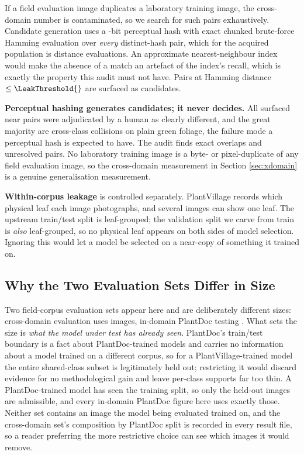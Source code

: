\documentclass[runningheads]{llncs}
\begin{document}
If a field evaluation image duplicates a laboratory training image, the
cross-domain number is contaminated, so we search for such pairs exhaustively.
Candidate generation uses a \PhashBits{}-bit perceptual hash with exact chunked
brute-force Hamming evaluation over \emph{every} distinct-hash pair, which for
the acquired population is \NPhashComparisonsSci{} distance evaluations. An
approximate nearest-neighbour index would make the absence of a match an artefact
of the index's recall, which is exactly the property this audit must not have.
Pairs at Hamming distance $\leq \LeakThreshold{}$ are surfaced as candidates.

\textbf{Perceptual hashing generates candidates; it never decides.} All
\NLeakNearCore{} surfaced near pairs were adjudicated by a human as clearly
different, and the great majority are cross-class collisions on plain green
foliage, the failure mode a perceptual hash is expected to have. The audit
finds \NLeakExactCore{} exact overlaps and \NLeakUnresolved{} unresolved pairs.
No laboratory training image is a byte- or pixel-duplicate of any field
evaluation image, so the cross-domain measurement in Section \ref{sec:xdomain}
is a genuine generalisation measurement.

\textbf{Within-corpus leakage} is controlled separately. PlantVillage records
which physical leaf each image photographs, and several images can show one
leaf. The upstream train/test split is leaf-grouped; the validation split we
carve from train is \emph{also} leaf-grouped, so no physical leaf appears on
both sides of model selection. Ignoring this would let a model be selected on a
near-copy of something it trained on.

\subsection{Why the Two Evaluation Sets Differ in Size}
\label{sec:two-eval-sets}

Two field-corpus evaluation sets appear here and are deliberately different
sizes: cross-domain evaluation uses \NXdImages{} images, in-domain PlantDoc
testing \NPdcTest{}. What sets the size is \emph{what the model under test has
already seen}. PlantDoc's train/test boundary is a fact about PlantDoc-trained
models and carries no information about a model trained on a different corpus,
so for a PlantVillage-trained model the entire shared-class subset is
legitimately held out; restricting it would discard evidence for no
methodological gain and leave per-class supports far too thin. A
PlantDoc-trained model has seen the training split, so only the \NPdcTest{}
held-out images are admissible, and every in-domain PlantDoc figure here uses
exactly those. Neither set contains an image the model being evaluated trained
on, and the cross-domain set's composition by PlantDoc split is recorded in every
result file, so a reader preferring the more restrictive choice can see which
images it would remove.
\end{document}
